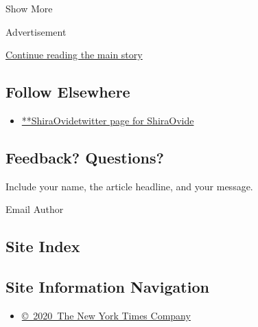 Show More

Advertisement

\protect\hyperlink{after-mid2}{Continue reading the main story}

\hypertarget{follow-elsewhere}{%
\subsection{Follow Elsewhere}\label{follow-elsewhere}}

\begin{itemize}
\tightlist
\item
  \href{https://twitter.com/ShiraOvide}{**ShiraOvidetwitter page for
  ShiraOvide}
\end{itemize}

\hypertarget{feedback-questions}{%
\subsection{Feedback? Questions?}\label{feedback-questions}}

Include your name, the article headline, and your message.

Email Author

\hypertarget{site-index}{%
\subsection{Site Index}\label{site-index}}

\hypertarget{site-information-navigation}{%
\subsection{Site Information
Navigation}\label{site-information-navigation}}

\begin{itemize}
\tightlist
\item
  \href{https://help.nytimes.com/hc/en-us/articles/115014792127-Copyright-notice}{©~2020~The
  New York Times Company}
\end{itemize}

